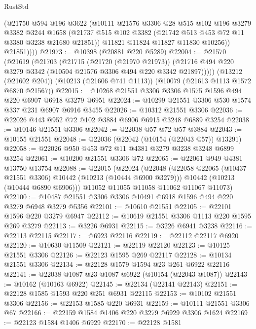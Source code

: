 \begin{lexlean}{RustStd}
\begin{coremodule}
            (@21750
              @594
              @196
              @3622
              (@10111
                @21576
                @3306
                @28
                @515
                @102
                @196
                @3279
                @3382
                @3244
                @1658
                (@21737 @515 @102 @3382 (@21742 @513 @453 @72 @11 @3380 @3238 @21680 @21851))
                @11821
                @11824
                @11827
                @11830
                @10256))
            @21851))))
@21973 := @10398 (@20881 @220 @5289)
@22004 := @21570
    (@21619
      (@21703
        (@21715
          (@21720 (@21970 @21973))
          (@21716 @494 @220 @3279 @3342 (@10504 @21576 @3306 @494 @220 @3342 @21897)))))
    (@13212 (@21602 @204))
    (@10213 (@21606 @741 @1113))
    (@10079 (@21613 @1113 @1572 @6870 @21567))
@22015 := @10268 @21551 @3306 @3306 @1575 @1596 @494 @220 @6907 @6918 @3279 @6951
@22024 := @10299 @21551 @3306 @530 @1574 @337 @231 @6907 @6916 @3455
@22026 := @10312 @21551 @3306
@22036 := @22026 @443 @952 @72 @102 @3884 @6906 @6915 @3248 @6889 @3254
@22038 := @10146 @21551 @3306
@22042 := @22038 @57 @72 @57 @3884
@22043 := @10155 @21551
@22048 := @22036 (@22042 (@10154 (@22043 @57)) @13291)
@22058 := @22026 @950 @453 @72 @11 @4381 @3279 @3238 @3248 @6899 @3254
@22061 := @10200 @21551 @3306 @72
@22065 := @22061 @949 @4381 @13750 @13754
@22088 := @22015
    (@22024
      (@22048
        (@22058 @22065 (@10437 @21551 @3306) @10442 (@10213 (@10444 @6900 @3279)))
        @10442
        (@10213 (@10444 @6890 @6906)))
      @11052
      @11055
      @11058
      @11062
      @11067
      @11073)
@22100 := @10487 @21551 @3306 @3306 @10491 @6918 @1596 @494 @220 @3279 @6948 @3279 @5356
@22101 := @10610 @21551
@22105 := @22101 @1596 @220 @3279 @6947
@22112 := @10619 @21551 @3306 @1113 @220 @1595 @269 @3279
@22113 := @3226 @6931
@22115 := @3226 @6941 @3238
@22116 := @22113 @22115
@22117 := @6923 @22116
@22119 := @22112 @22117 @6920
@22120 := @10630 @11509
@22121 := @22119 @22120
@22123 := @10125 @21551 @3306
@22126 := @22123 @1595 @269 @22117
@22128 := @10134 @21551 @3306
@22134 := @22128 @1579 @1594 @23 @261 @6922 @22116
@22141 := @22038 @1087 @23 @1087 @6922 (@10154 (@22043 @1087))
@22143 := @10162 (@10163 @6922)
@22145 := @22134 (@22141 @22143)
@22151 := @22128 @1585 @1593 @220 @251 @6931 @22115
@22153 := @10102 @21551 @3306
@22156 := @22153 @1585 @220 @6931
@22159 := @10111 @21551 @3306 @67
@22166 := @22159 @1584 @1406 @220 @3279 @6929 @3306 @1624
@22169 := @22123 @1584 @1406 @6929
@22170 := @22128 @1581

\end{coremodule}
\end{lexlean}
